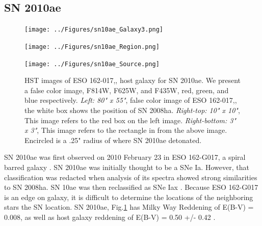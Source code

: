 \documentclass[preprint]{aastex}
\begin{document}
\subsection{SN 2010ae}
\begin{centering}
	\begin{figure}
	\begin{minipage}[c][7cm]{.6\textwidth}
		\vspace*{\fill}
		\centering
		\texttt{[image: ../Figures/sn10ae\_Galaxy3.png]}
			\label{fig:10aegal}
	\end{minipage}
	\begin{minipage}[c][7cm]{.5\textwidth}
		\vspace*{-.5cm}
		\centering
		\hspace*{-1.9cm}\texttt{[image: ../Figures/sn10ae\_Region.png]}
			\label{fig:r10ae}\par
		\hspace*{-1.9cm}\texttt{[image: ../Figures/sn10ae\_Source.png]}
			\label{fig:s10ae}
	\end{minipage}
	\caption{HST images of ESO 162-017,, host galaxy for SN 2010ae. We present a false color image,
	 F814W, F625W, and F435W, red, green, and blue respectively. \textit{Left: 80" x 55"}, false color image of 
	ESO 162-017,, the white box shows the position of SN 2008ha. \textit{Right-top: 10" x 10"},
	This image refers to the red box on the left image. 
	\textit{Right-bottom: 3" x 3"}, This image refers to the rectangle in from the above image. 
	Encircled is a .25" radius of where SN 2010ae detonated.}
	\label{fig:10ae_whole}
\end{figure}
\end{centering}

SN 2010ae was first observed on 2010 February 23 in ESO 162-G017, a spiral barred galaxy \citep{pig10}.
SN 2010ae was initially thought to be a SNe Ia. However, that classification
was redacted when analysis of its spectra showed strong similarities to
SN 2008ha. SN 10ae was then reclassified as SNe Iax \citep{str1003}.
Because ESO 162-G017  is an edge on galaxy,
it is difficult to determine the locations of the neighboring stars the SN location.
SN 2010ae, Fig.\ref{fig:10ae_whole} has Milky Way Reddening of E(B-V) = 0.008, as well as
host galaxy reddening of E(B-V) = 0.50 +/- 0.42 \citep{str1401}. 
\end{document}
